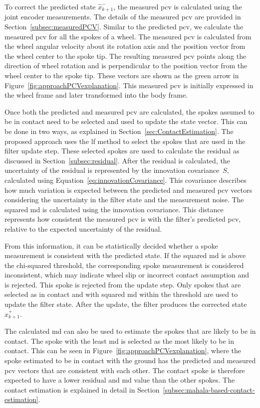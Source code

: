 \documentclass[report.tex]{subfiles}
\begin{document}
    To correct the predicted state $\hat{x}^{-}_{k+1}$, the measured \gls{pcv} is calculated using the joint encoder measurements. The details of the measured \gls{pcv} are provided in Section~\ref{subsec:measuredPCV}. Similar to the predicted \gls{pcv}, we calculate the measured \gls{pcv} for all the spokes of a wheel. The measured \gls{pcv} is calculated from the wheel angular velocity about its rotation axis and the position vector from the wheel center to the spoke tip. The resulting measured \gls{pcv} points along the direction of wheel rotation and is perpendicular to the position vector from the wheel center to the spoke tip. These vectors are shown as the green arrow in Figure~\ref{fig:approachPCVexplanation}. This measured \gls{pcv} is initially expressed in the wheel frame and later transformed into the body frame.
        
    Once both the predicted and measured \gls{pcv} are calculated, the spokes assumed to be in contact need to be selected and used to update the state vector. This can be done in two ways, as explained in Section~\ref{sec:ContactEstimation}. The proposed approach uses the \gls{lf} method to select the spokes that are used in the filter update step. These selected spokes are used to calculate the residual as discussed in Section~\ref{subsec:residual}. After the residual is calculated, the uncertainty of the residual is represented by the innovation covariance~$S$, calculated using Equation~\ref{eq:innovationCovariance}. This covariance describes how much variation is expected between the predicted and measured \gls{pcv} vectors considering the uncertainty in the filter state and the measurement noise. The squared \gls{md} is calculated using the innovation covariance. This distance represents how consistent the measured \gls{pcv} is with the filter's predicted \gls{pcv}, relative to the expected uncertainty of the residual.

    From this information, it can be statistically decided whether a spoke measurement is consistent with the predicted state. If the squared \gls{md} is above the chi-squared threshold, the corresponding spoke measurement is considered inconsistent, which may indicate wheel slip or incorrect contact assumption and is rejected. This spoke is rejected from the update step. Only spokes that are selected as in contact and with squared \gls{md} within the threshold are used to update the filter state. After the update, the filter produces the corrected state $\hat{x}^{+}_{k+1}$. 
    
    The calculated \gls{md} can also be used to estimate the spokes that are likely to be in contact. The spoke with the least \gls{md} is selected as the most likely to be in contact. This can be seen in Figure~\ref{fig:approachPCVexplanation}, where the spoke estimated to be in contact with the ground has the predicted and measured \gls{pcv} vectors that are consistent with each other. The contact spoke is therefore expected to have a lower residual and \gls{md} value than the other spokes. The contact estimation is explained in detail in Section~\ref{subsec:mahala-based-contact-estimation}. 
    
\end{document}
